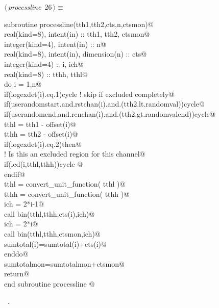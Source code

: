 \documentclass[10pt,a4paper,notitlepage]{article}
\begin{document}
\begin{flushleft} \small
\begin{minipage}{\linewidth}\label{scrap30}\raggedright\small
{} $\langle\,${\it processline}\nobreak\ {\footnotesize {26}}$\,\rangle\equiv$
\vspace{-1ex}
\begin{list}{}{} \item
\mbox{}\verb@      subroutine processline(tth1,tth2,cts,n,ctsmon)@\\
\mbox{}\verb@      real(kind=8), intent(in) :: tth1, tth2, ctsmon@\\
\mbox{}\verb@      integer(kind=4), intent(in) :: n@\\
\mbox{}\verb@      real(kind=8), intent(in), dimension(n) :: cts@\\
\mbox{}\verb@      integer(kind=4) :: i, ich@\\
\mbox{}\verb@      real(kind=8) :: tthh, tthl@\\
\mbox{}\verb@      do i = 1,n@\\
\mbox{}\verb@        if(logexdet(i).eq.1)cycle ! skip if excluded completely@\\
\mbox{}\verb@        if(userandomstart.and.rstchan(i).and.(tth2.lt.randomval))cycle@\\
\mbox{}\verb@        if(userandomend.and.renchan(i).and.(tth2.gt.randomvalend))cycle@\\
\mbox{}\verb@        tthl = tth1 - offset(i)@\\
\mbox{}\verb@        tthh = tth2 - offset(i)@\\
\mbox{}\verb@        if(logexdet(i).eq.2)then@\\
\mbox{}\verb@! Is this an excluded region for this channel@\\
\mbox{}\verb@          if(led(i,tthl,tthh))cycle  @\\
\mbox{}\verb@        endif@\\
\mbox{}\verb@        tthl = convert_unit_function( tthl )@\\
\mbox{}\verb@        tthh = convert_unit_function( tthh )@\\
\mbox{}\verb@        ich = 2*i-1@\\
\mbox{}\verb@        call bin(tthl,tthh,cts(i),ich)@\\
\mbox{}\verb@        ich = 2*i@\\
\mbox{}\verb@        call bin(tthl,tthh,ctsmon,ich)@\\
\mbox{}\verb@        sumtotal(i)=sumtotal(i)+cts(i)@\\
\mbox{}\verb@      enddo@\\
\mbox{}\verb@      sumtotalmon=sumtotalmon+ctsmon@\\
\mbox{}\verb@      return@\\
\mbox{}\verb@      end subroutine processline                                             @{\NWsep}
\end{list}
\vspace{-1.5ex}
\footnotesize
\begin{list}{}{\setlength{\itemsep}{-\parsep}\setlength{\itemindent}{-\leftmargin}}
\item \NWtxtMacroRefIn\ .


\end{list}
\end{minipage}
\end{flushleft}
\end{document}
